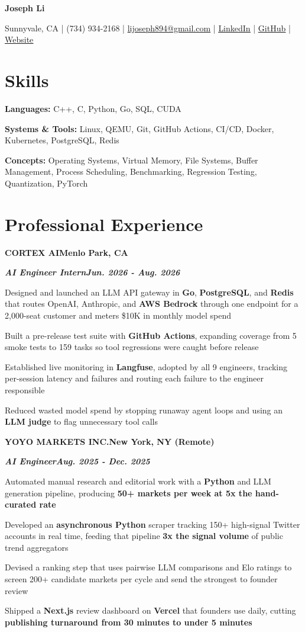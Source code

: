 \documentclass[10pt]{article}
\renewcommand{\resumeheader}[2]{%
  {\centering\fontsize{16}{18}\selectfont\bfseries #1\par}%
  \vspace{4pt}%
  {\centering\fontsize{10.5}{13}\selectfont #2\par}%
  \vspace{6pt}%
}
\renewcommand{\skill}[2]{\textbf{#1:} #2\par\vspace{1.5pt}}
\newcommand{\job}[4]{%
  \vspace{0pt}%
  \textbf{\MakeUppercase{#1}}\hfill\textbf{#2}\par
  \vspace{0.5pt}%
  \textbf{\textit{#3}}\hfill\textbf{\textit{#4}}\par
}
\begin{document}
\resumeheader{Joseph Li}{%
Sunnyvale, CA | (734) 934-2168 | \href{mailto:lijoseph894@gmail.com}{lijoseph894@gmail.com} | \href{https://www.linkedin.com/in/lijoseph894/}{\underline{LinkedIn}} | \href{https://github.com/josephl894}{\underline{GitHub}} | \href{https://josephl894.github.io}{\underline{Website}}}

\section{Skills}
\skill{Languages}{C++, C, Python, Go, SQL, CUDA}
\skill{Systems \& Tools}{Linux, QEMU, Git, GitHub Actions, CI/CD, Docker, Kubernetes, PostgreSQL, Redis}
\skill{Concepts}{Operating Systems, Virtual Memory, File Systems, Buffer Management, Process Scheduling, Benchmarking, Regression Testing, Quantization, PyTorch}

\section{Professional Experience}
\job{Cortex AI}{Menlo Park, CA}{AI Engineer Intern}{Jun. 2026 - Aug. 2026}
\begin{bullets}
  \item Designed and launched an LLM API gateway in \textbf{Go}, \textbf{PostgreSQL}, and \textbf{Redis} that routes OpenAI, Anthropic, and \textbf{AWS Bedrock} through one endpoint for a 2,000-seat customer and meters \$10K in monthly model spend
  \item Built a pre-release test suite with \textbf{GitHub Actions}, expanding coverage from 5 smoke tests to 159 tasks so tool regressions were caught before release
  \item Established live monitoring in \textbf{Langfuse}, adopted by all 9 engineers, tracking per-session latency and failures and routing each failure to the engineer responsible
  \item Reduced wasted model spend by stopping runaway agent loops and using an \textbf{LLM judge} to flag unnecessary tool calls
\end{bullets}

\vspace{3pt}
\job{Yoyo Markets Inc.}{New York, NY (Remote)}{AI Engineer}{Aug. 2025 - Dec. 2025}
\begin{bullets}
  \item Automated manual research and editorial work with a \textbf{Python} and LLM generation pipeline, producing \textbf{50+ markets per week at 5x the hand-curated rate}
  \item Developed an \textbf{asynchronous Python} scraper tracking 150+ high-signal Twitter accounts in real time, feeding that pipeline \textbf{3x the signal volume} of public trend aggregators
  \item Devised a ranking step that uses pairwise LLM comparisons and Elo ratings to screen 200+ candidate markets per cycle and send the strongest to founder review
  \item Shipped a \textbf{Next.js} review dashboard on \textbf{Vercel} that founders use daily, cutting \textbf{publishing turnaround from 30 minutes to under 5 minutes}
\end{bullets}
\end{document}
